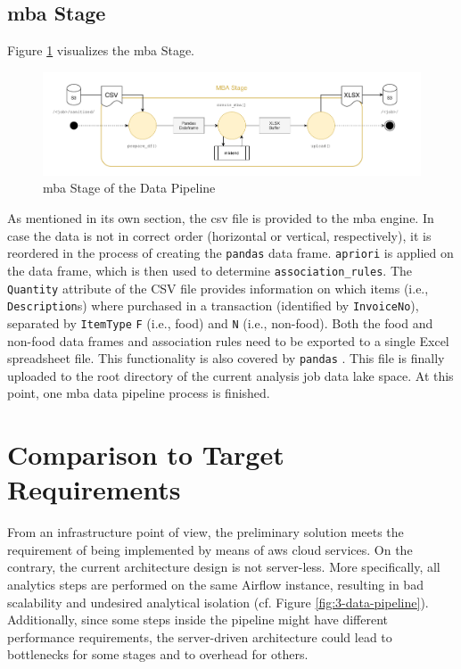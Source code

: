 \subsection{\acs{mba} Stage}
Figure \ref{fig:3-mba} visualizes the \ac{mba} Stage.

\begin{figure}[h!]
	\includegraphics[width=\linewidth]{main-matter/img/3-3-4-mba.pdf}
	\caption{\acs{mba} Stage of the Data Pipeline}
	\label{fig:3-mba}	
\end{figure}

As mentioned in its own section, the \ac{csv} file is provided to the \ac{mba} engine. In case the data is not in correct order (horizontal or vertical, respectively), it is reordered in the process of creating the \texttt{pandas} data frame. \texttt{apriori} is applied on the data frame, which is then used to determine \texttt{association\_rules}. The \texttt{Quantity} attribute of the CSV file provides information on which items (i.e., \texttt{Description}s) where purchased in a transaction (identified by \texttt{InvoiceNo}), separated by \texttt{ItemType} \texttt{F} (i.e., food) and \texttt{N} (i.e., non-food). Both the food and non-food data frames and association rules need to be exported to a single Excel spreadsheet file. This functionality is also covered by \texttt{pandas} \cite{pandas}. This file is finally uploaded to the root directory of the current analysis job data lake space. At this point, one \ac{mba} data pipeline process is finished. 


\section{Comparison to Target Requirements}
From an infrastructure point of view, the preliminary solution meets the requirement of being implemented by means of \ac{aws} cloud services. On the contrary, the current architecture design is not server-less. More specifically, all analytics steps are performed on the same Airflow instance, resulting in bad scalability and undesired analytical isolation (cf. Figure \ref{fig:3-data-pipeline}). Additionally, since some steps inside the pipeline might have different performance requirements, the server-driven architecture could lead to bottlenecks for some stages and to overhead for others.

